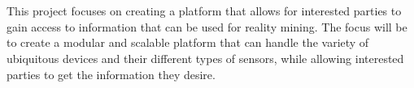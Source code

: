 \\\\
This project focuses on creating a platform that allows for interested parties to gain access to information that can be used for reality mining. The focus will be to create a modular and scalable platform that can handle the variety of ubiquitous devices and their different types of sensors, while allowing interested parties to get the information they desire.





